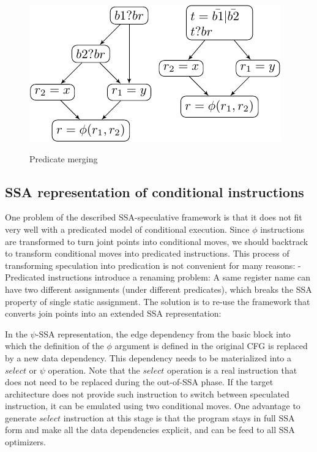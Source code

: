 \begin{figure}
  \includegraphics[scale=0.8]{phi_merge}
  \label{fig:phi_merge}
\caption{Predicate merging}
\end{figure}

\subsection{SSA representation of conditional instructions}

One problem of the described SSA-speculative framework is that it does not fit very well with a predicated model of conditional execution. Since $\phi$ instructions are transformed to turn joint points into conditional moves, we should backtrack to transform conditional moves into predicated instructions. This process of transforming speculation into predication is not convenient for many reasons:
- Predicated instructions introduce a renaming problem: A same register name can have two different assignments (under different predicates), which breaks the SSA property of single static assignment. The solution is to re-use the framework that converts join points into an extended SSA representation:

In the $\psi$-SSA representation, the edge dependency from the basic block into which the definition of the $\phi$ argument is defined in the original CFG is replaced by a new data dependency. This dependency needs to be materialized into a $select$ or $\psi$ operation. Note that the $select$ operation is a real instruction that does not need to be replaced during the out-of-SSA phase. If the target architecture does not provide such instruction to switch between speculated instruction, it can be emulated using two conditional moves. One advantage to generate $select$ instruction at this stage is that the program stays in full SSA form and make all the data dependencies explicit, and can be feed to all SSA optimizers. 

